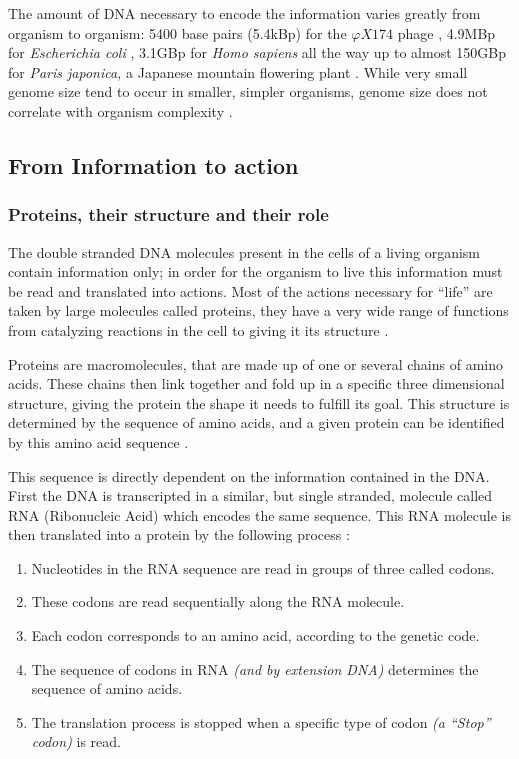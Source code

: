 \documentclass[
  11pt,
  twoside,
  BCOR=10mm,
  listof=totoc]{scrbook}
\providecommand{\tightlist}{%
  \setlength{\itemsep}{0pt}\setlength{\parskip}{0pt}}
\begin{document}
The amount of DNA necessary to encode the information varies greatly from organism to organism: 5400 base pairs (5.4kBp) for the \(\varphi X174\) phage \autocite{sangerNucleotideSequenceBacteriophage1977}, 4.9MBp for \emph{Escherichia coli} \autocite{archer2011}, 3.1GBp for \emph{Homo sapiens} \autocite{nurk2022} all the way up to almost 150GBp for \emph{Paris japonica,} a Japanese mountain flowering plant \autocite{pellicer2010}. While very small genome size tend to occur in smaller, simpler organisms, genome size does not correlate with organism complexity \autocite{macgregor2001}.

\hypertarget{from-information-to-action}{%
\subsection{From Information to action}\label{from-information-to-action}}

\hypertarget{proteins-their-structure-and-their-role}{%
\subsubsection{Proteins, their structure and their role}\label{proteins-their-structure-and-their-role}}

The double stranded DNA molecules present in the cells of a living organism contain information only; in order for the organism to live this information must be read and translated into actions. Most of the actions necessary for ``life'' are taken by large molecules called proteins, they have a very wide range of functions from catalyzing reactions in the cell to giving it its structure \autocite{alberts2002}.

Proteins are macromolecules, that are made up of one or several chains of amino acids. These chains then link together and fold up in a specific three dimensional structure, giving the protein the shape it needs to fulfill its goal. This structure is determined by the sequence of amino acids, and a given protein can be identified by this amino acid sequence \autocite{alberts2002}.

This sequence is directly dependent on the information contained in the DNA. First the DNA is transcripted in a similar, but single stranded, molecule called RNA (Ribonucleic Acid) which encodes the same sequence. This RNA molecule is then translated into a protein by the following process \autocite{crick1961}:

\begin{enumerate}
\def\labelenumi{\arabic{enumi}.}
\tightlist
\item
  Nucleotides in the RNA sequence are read in groups of three called codons.
\item
  These codons are read sequentially along the RNA molecule.
\item
  Each codon corresponds to an amino acid, according to the genetic code.
\item
  The sequence of codons in RNA \emph{(and by extension DNA)} determines the sequence of amino acids.
\item
  The translation process is stopped when a specific type of codon \emph{(a ``Stop'' codon)} is read.
\end{enumerate}
\end{document}
